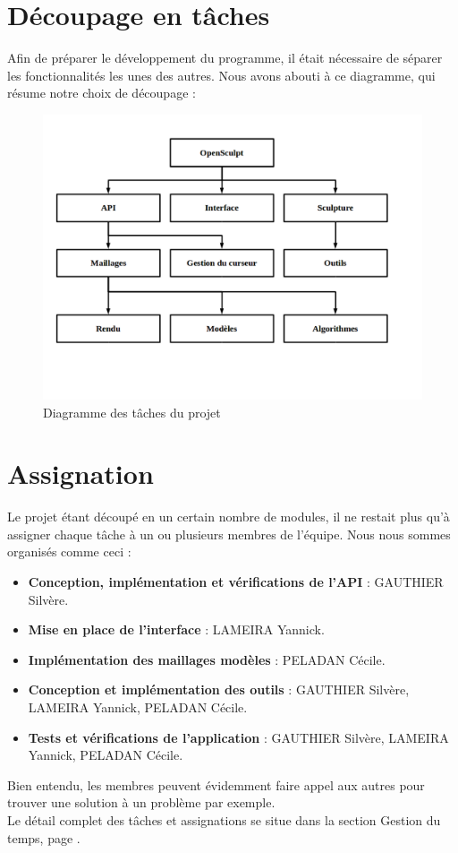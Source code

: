 \documentclass[a4paper]{memoir}
\begin{document}
		\section{Découpage en tâches}
			Afin de préparer le développement du programme, il était nécessaire de séparer les fonctionnalités les unes des autres. Nous avons abouti à ce 
			diagramme, qui résume notre choix de découpage :\\
			\begin{figure}[H]
				\begin{center}
					\includegraphics[scale=0.5]{img/DiagrammeDecoupageProjet.png}
				\end{center}
				\label{fig:decoupage}
				\caption{Diagramme des tâches du projet}
			\end{figure}

		\section{Assignation}
			Le projet étant découpé en un certain nombre de modules, il ne restait plus qu'à assigner chaque tâche à un ou plusieurs membres de l'équipe. 
			Nous nous sommes organisés comme ceci :
			\begin{itemize}[label=$\bullet$]
				\item \textbf{Conception, implémentation et vérifications de l'API} : GAUTHIER Silvère.
				\item \textbf{Mise en place de l'interface} : LAMEIRA Yannick.
				\item \textbf{Implémentation des maillages modèles} : PELADAN Cécile.
				\item \textbf{Conception et implémentation des outils} : GAUTHIER Silvère, LAMEIRA Yannick, PELADAN Cécile.
				\item \textbf{Tests et vérifications de l'application} : GAUTHIER Silvère, LAMEIRA Yannick, PELADAN Cécile.
			\end{itemize}
			Bien entendu, les membres peuvent évidemment faire appel aux autres pour trouver une solution à un problème par exemple.\\
			Le détail complet des tâches et assignations se situe dans la section Gestion du temps, page \pageref{GestionTps}.
\end{document}

